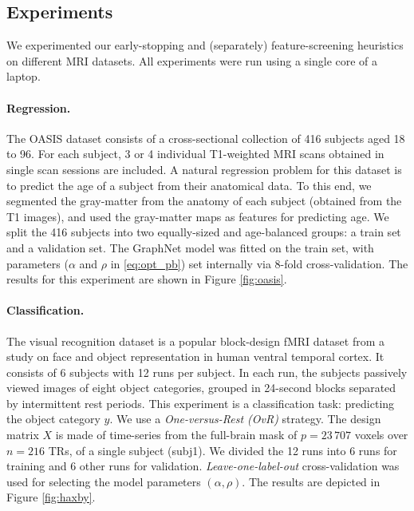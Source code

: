 \subsection{Experiments}
We experimented our early-stopping and (separately)
feature-screening heuristics on different MRI datasets.
All experiments were run using a single core of
  a laptop.

\paragraph{Regression.} The OASIS dataset
     \citep{marcus2007open} consists of a
    cross-sectional collection of 416 subjects aged 18 to 96. For each
    subject, 3 or 4 individual T1-weighted MRI scans obtained in
    single scan sessions are included.   A natural regression problem
    for this dataset is to predict the age of a subject from their
    anatomical data. To this end, we segmented the gray-matter from
    the anatomy of each subject (obtained from the T1 images), and
    used the gray-matter maps
    as features for predicting age. We split the 416 subjects into two
    equally-sized and age-balanced groups: a train set and a validation
    set. The GraphNet model  \citep{hebiri2011,grosenick2013} was fitted
    on the train set, with parameters
    ($\alpha$ and $\rho$ in \eqref{eq:opt_pb}) set internally via 8-fold
    cross-validation. The results for this experiment are shown in
    Figure \ref{fig:oasis}.

\paragraph{Classification.} The visual
    recognition dataset  \citep{haxby2001} is a popular block-design
    fMRI dataset from a
    study on face and object representation in human ventral temporal
    cortex.
It consists of 6 subjects with 12 runs per subject. In each run, the
subjects
passively viewed images of eight object categories, grouped
in 24-second blocks separated by intermittent rest periods. This
experiment is a classification task: predicting the object category
$y$. We use a \textit{One-versus-Rest (OvR)} strategy. The design
matrix ${X}$ is made of
time-series from the full-brain mask of $p = 23\,707$ voxels over $n =
216$ TRs, of a single subject (subj1). We divided the 12 runs into 6
runs for training and 6 other runs for
validation. \textit{Leave-one-label-out} cross-validation was used for
selecting the model parameters $(\alpha, \rho)$. The results are
depicted in Figure \ref{fig:haxby}.

